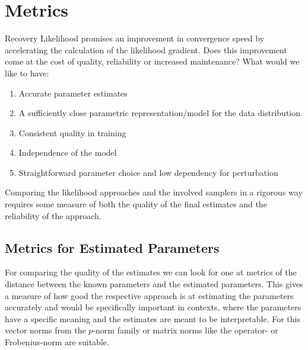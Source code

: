 
\section{Metrics}

Recovery Likelihood promises an improvement in convergence speed by accelerating the calculation of the likelihood gradient.
Does this improvement come at the cost of quality, reliability or increased maintenance?
What would we like to have:
\begin{enumerate}
	\item Accurate parameter estimates
	\item A sufficiently close parametric representation/model for the data distribution
	\item Consistent quality in training
	\item Independence of the model
	\item Straightforward parameter choice and low dependency for perturbation 
\end{enumerate}

Comparing the likelihood approaches and the involved samplers in a rigorous way requires some measure 
of both the quality of the final estimates and the reliability of the approach.


\subsection{Metrics for Estimated Parameters}
For comparing the quality of the estimates we can look for one at metrics of the distance between the known parameters and the estimated parameters.
This gives a measure of how good the respective approach is at estimating the parameters accurately and would be specifically important in contexts, 
where the parameters have a specific meaning and the estimates are meant to be interpretable.
For this vector norms from the $p$-norm family or matrix norms like the operator- or Frobenius-norm are suitable.






